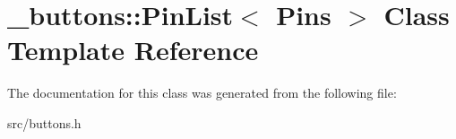 \hypertarget{class__buttons_1_1PinList}{}\section{\+\_\+buttons\+:\+:Pin\+List$<$ Pins $>$ Class Template Reference}
\label{class__buttons_1_1PinList}


The documentation for this class was generated from the following file\+:\begin{DoxyCompactItemize}
\item 
src/buttons.\+h\end{DoxyCompactItemize}

